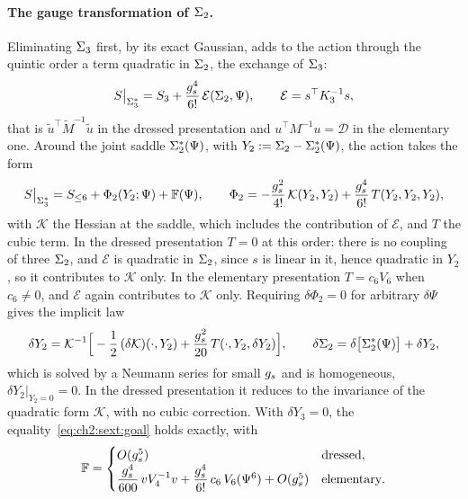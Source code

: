 \paragraph{The gauge transformation of $\Sigma_2$.}
Eliminating $\Sigma_3$ first, by its exact Gaussian, adds to the action through the quintic order a term quadratic in $\Sigma_2$, the exchange of $\Sigma_3$:
\begin{equation}
  S \big|_{\Sigma_3^*}
    = S_3 + \frac{g_s^4}{6!} \, \mathcal E(\Sigma_2, \Psi),
  \qquad
  \mathcal E
    = s^\top K_3^{-1} s,
\end{equation}
that is $\tilde u^\top \tilde M^{-1} \tilde u$ in the dressed presentation and $u^\top M^{-1} u = \mathcal D$ in the elementary one.
Around the joint saddle $\Sigma_2^*(\Psi)$, with $Y_2 := \Sigma_2 - \Sigma_2^*(\Psi)$, the action takes the form
\begin{equation}
  S \big|_{\Sigma_3^*}
    = S_{\le 6} + \Phi_2(Y_2; \Psi) + \mathbb F(\Psi),
  \qquad
  \Phi_2
    = - \frac{g_s^2}{4!} \, \mathcal K(Y_2, Y_2) + \frac{g_s^4}{6!} \, T(Y_2, Y_2, Y_2),
\end{equation}
with $\mathcal K$ the Hessian at the saddle, which includes the contribution of $\mathcal E$, and $T$ the cubic term.
In the dressed presentation $T = 0$ at this order: there is no coupling of three $\Sigma_2$, and $\mathcal E$ is quadratic in $\Sigma_2$, since $s$ is linear in it, hence quadratic in $Y_2$, so it contributes to $\mathcal K$ only.
In the elementary presentation $T = c_6 V_6$ when $c_6 \ne 0$, and $\mathcal E$ again contributes to $\mathcal K$ only.
Requiring $\delta \Phi_2 = 0$ for arbitrary $\delta \Psi$ gives the implicit law
\begin{equation}
  \label{eq:ch2:sext:gauge2}
  \delta Y_2
    = \mathcal K^{-1} \Big[ - \frac12 \, (\delta \mathcal K)(\cdot, Y_2) + \frac{g_s^2}{20} \, T(\cdot, Y_2, \delta Y_2) \Big],
  \qquad
  \delta \Sigma_2
    = \delta \big[ \Sigma_2^*(\Psi) \big] + \delta Y_2,
\end{equation}
which is solved by a Neumann series for small $g_s$ and is homogeneous, $\delta Y_2 |_{Y_2 = 0} = 0$.
In the dressed presentation it reduces to the invariance of the quadratic form $\mathcal K$, with no cubic correction.
With $\delta Y_3 = 0$, the equality~\eqref{eq:ch2:sext:goal} holds exactly, with
\begin{equation}
  \label{eq:ch2:sext:F}
  \mathbb F
    =
    \begin{cases}
      O(g_s^5)
        & \text{dressed},
      \\
      \dfrac{g_s^4}{600} \, v V_4^{-1} v + \dfrac{g_s^4}{6!} \, c_6 \, V_6(\Psi^6) + O(g_s^5)
        & \text{elementary}.
    \end{cases}
\end{equation}
